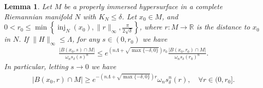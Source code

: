 \documentclass{amsart}
\numberwithin{equation}{section}
\newtheorem{lem}[theo]{Lemma}
\theoremstyle{remark}
\renewcommand{\(}{\left(}
\renewcommand{\)}{\right)}
\renewcommand{\~}{\tilde}
\renewcommand{\-}{\overline}
\renewcommand{\d}{\delta}
\renewcommand{\L}{\Lambda}
\newcommand{\ra}{\rightarrow}
\newcommand{\inj}{\operatorname{inj}}
\begin{document}
\begin{lem}\label{lem-local-ball-volume-estimate}
Let $M$ be a properly immersed hypersurface in a complete Riemannian manifold $N$ with $K_N\leq \d$. Let $x_0\in M$, and $0< r_0\le \min\left\{\inj_N (x_0), \|r\|_\infty, \frac{\pi}{2\sqrt{\d}}\right\}$, where $r:M\to \mathbb R$ is the distance to $x_0$ in $N$. If $\|H\|_\infty\leq \L$, for any $s\in (0,r_0)$ we have
\begin{align*}
\frac{|B(x_0,s) \cap M|}{\omega_n s_\d(s)^n} \leq e^{(n\L +\sqrt{\max\{-\d,0\}})r_0} \frac{|B(x_0,r_0) \cap M|}{\omega_n s_\d(r_0)^n}.
\end{align*}
In particular, letting $s\ra 0$ we have
\begin{align*}
|B(x_0,r) \cap M| \ge e^{-(n\L +\sqrt{\max\{-\d,0\}})r}\omega_n s_\d^n(r), \quad \forall r\in(0,r_0].
\end{align*}
\end{lem}
\end{document}
